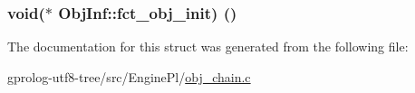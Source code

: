 \subsubsection[{\texorpdfstring{fct\+\_\+obj\+\_\+init}{fct_obj_init}}]{\setlength{\rightskip}{0pt plus 5cm}void($\ast$ Obj\+Inf\+::fct\+\_\+obj\+\_\+init) ()}\hypertarget{structObjInf_a87ba4456d48d1ca4b94a0d0e7f44650c}{}\label{structObjInf_a87ba4456d48d1ca4b94a0d0e7f44650c}


The documentation for this struct was generated from the following file\+:\begin{DoxyCompactItemize}
\item 
gprolog-\/utf8-\/tree/src/\+Engine\+Pl/\hyperlink{obj__chain_8c}{obj\+\_\+chain.\+c}\end{DoxyCompactItemize}
